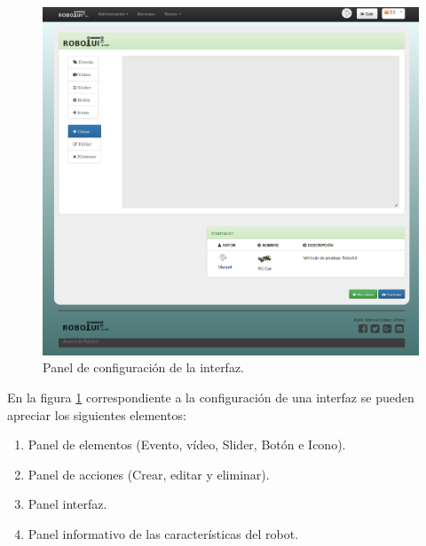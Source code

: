 \begin{figure}[H]
  \begin{center}
    \includegraphics[scale=0.4]{imagenes/manual-usuario/pagina-configurar-interfaz.png}
  \end{center}
  \caption{Panel de configuración de la interfaz.}
  \label{website:configuracion-interfaz}
\end{figure}

En la figura \ref{website:configuracion-interfaz} correspondiente a la configuración de una interfaz se pueden apreciar los siguientes elementos:

\begin{enumerate}
  \item Panel de elementos (Evento, vídeo, Slider, Botón e Icono).
 \item Panel de acciones (Crear, editar y eliminar).
 \item Panel interfaz.
 \item Panel informativo de las características del robot.
\end{enumerate}


